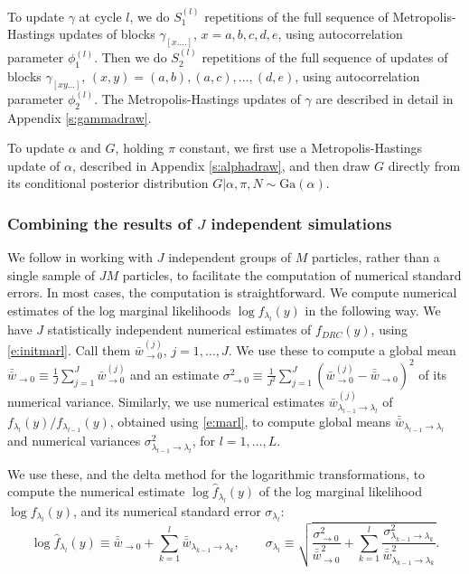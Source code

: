 \documentclass[11pt,letter]{article}
\begin{document}
To update $\gamma$ at cycle $l$, we do $S_1^{(l)}$ repetitions of the full sequence of Metropolis-Hastings updates of blocks $\gamma_{[x....]}$, $x=a,b,c,d,e$, using autocorrelation parameter $\phi_1^{(l)}$.
Then we do $S_2^{(l)}$ repetitions of the full sequence of updates of blocks $\gamma_{[xy...]}$, $(x,y) = (a,b),(a,c),\ldots,(d,e)$, using autocorrelation parameter $\phi_2^{(l)}$.
The Metropolis-Hastings updates of $\gamma$ are described in detail in Appendix \ref{s:gammadraw}.

To update $\alpha$ and $G$, holding $\pi$ constant, we first use a Metropolis-Hastings update of $\alpha$, described in Appendix \ref{s:alphadraw}, and then draw $G$ directly from its conditional posterior distribution $G|\alpha,\pi,N \sim \mathrm{Ga}(\alpha)$.

\subsubsection{Combining the results of $J$ independent simulations}
We follow  in working with $J$ independent groups of $M$ particles, rather than a single sample of $JM$ particles, to facilitate the computation of numerical standard errors.
In most cases, the computation is straightforward.
We compute numerical estimates of the log marginal likelihoods $\log f_{\lambda_l}(y)$ in the following way.
We have $J$ statistically independent numerical estimates of $f_{DRC}(y)$, using \eqref{e:initmarl}.
Call them $\bar{w}^{(j)}_{\to 0}$, $j=1,\ldots,J$.
We use these to compute a global mean $\bar{\bar{w}}_{\to 0} \equiv \tfrac{1}{J} \sum_{j=1}^J \bar{w}^{(j)}_{\to 0}$
and an estimate $\sigma_{\to 0}^2 \equiv \tfrac{1}{J^2} \sum_{j=1}^J (\bar{w}^{(j)}_{\to 0} - \bar{\bar{w}}_{\to 0})^2$ of its numerical variance.
Similarly, we use numerical estimates $\bar{w}_{\lambda_{l-1} \to \lambda_l}^{(j)}$ of $f_{\lambda_l}(y)/f_{\lambda_{l-1}}(y)$, obtained using \eqref{e:marl}, to compute global means $\bar{\bar{w}}_{\lambda_{l-1} \to \lambda_l}$ and numerical variances $\sigma_{\lambda_{l-1} \to \lambda_l}^2$, for $l=1,\ldots,L$.

We use these, and the delta method for the logarithmic transformations, to compute the numerical estimate $\log \hat{f}_{\lambda_l}(y)$ of the log marginal likelihood $\log f_{\lambda_l}(y)$, and its numerical standard error $\sigma_{\lambda_l}$:
\[
  \log \hat{f}_{\lambda_l}(y) \equiv \bar{\bar{w}}_{\to 0} + \sum_{k=1}^l \bar{\bar{w}}_{\lambda_{k-1} \to \lambda_k},
  \qquad
  \sigma_{\lambda_l} \equiv \sqrt{\frac{\sigma^2_{\to 0}}{\bar{\bar{w}}^2_{\to 0}}
  + \sum_{k=1}^l \frac{\sigma^2_{\lambda_{k-1} \to \lambda_k}}{\bar{\bar{w}}^2_{\lambda_{k-1}\to \lambda_k}}}.
\]
\end{document}

